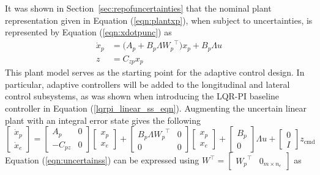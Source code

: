 It was shown in Section~\ref{sec:repofuncertainties} that the nominal plant representation given in Equation (\ref{eqn:plantxp}), when subject to uncertainties, is represented by Equation (\ref{eqn:xdotpunc}) as
\begin{equation}
  \begin{split}
    \dot{x}_{p}&=\bigr(A_{p}+B_{p}\Lambda{W_{p}}^{\top}\bigr)x_{p}+B_{p}\Lambda u \\
    z&=C_{zp}x_{p}
  \end{split}
\end{equation}
This plant model serves as the starting point for the adaptive control design.
In particular, adaptive controllers will be added to the longitudinal and lateral control subsystems, as was shown when introducing the LQR-PI baseline controller in Equation (\ref{lqrpi_linear_ss_eqn}).
Augmenting the uncertain linear plant with an integral error state gives the following
\begin{equation}
  \label{eqn:uncertainss}
  \begin{bmatrix}
    \dot{x}_{p} \\
    \dot{x}_{e}
  \end{bmatrix}=
  \begin{bmatrix}
    A_{p} & 0 \\
    -C_{pz} & 0
  \end{bmatrix}
  \begin{bmatrix}
    x_{p} \\
    x_{e}
  \end{bmatrix}+
  \begin{bmatrix}
    B_{p}\Lambda{W_{p}}^{\top} & 0 \\
    0 & 0
  \end{bmatrix}
  \begin{bmatrix}
    x_{p} \\
    x_{e}
  \end{bmatrix}+
  \begin{bmatrix}
    B_{p} \\
    0
  \end{bmatrix}\Lambda u+
  \begin{bmatrix}
    0 \\
    I
  \end{bmatrix}z_{\text{cmd}}
\end{equation}
Equation (\ref{eqn:uncertainss}) can be expressed using $W^{\top}=[\begin{array}{cc} {W_{p}}^{\top} & 0_{m\times n_{e}} \end{array}]$ as
